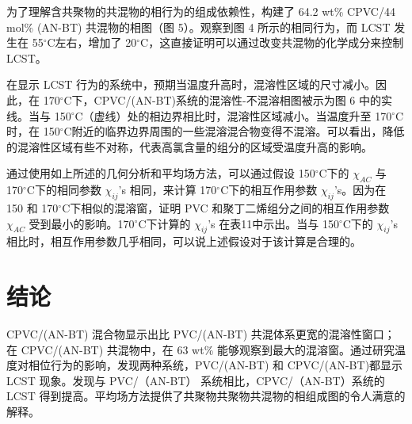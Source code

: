 \documentclass[a4paper,transmag,12pt]{IEEEtran}    %
\newcommand{\cdegree}{$^{\circ}$C}  %
\begin{document}
为了理解含共聚物的共混物的相行为的组成依赖性，构建了 64.2 wt\% CPVC/44 mol\% (AN-BT) 共混物的相图（图 5）。观察到图 4 所示的相同行为，而 LCST 发生在 55\cdegree 左右，增加了 20\cdegree，这直接证明可以通过改变共混物的化学成分来控制 LCST。\par{}
在显示 LCST 行为的系统中，预期当温度升高时，混溶性区域的尺寸减小。因此，在 170\cdegree 下，CPVC/(AN-BT)系统的混溶性-不混溶相图被示为图 6 中的实线。当与 150\cdegree（虚线）处的相边界相比时，混溶性区域减小。当温度升至 170\cdegree 时，在 150\cdegree 附近的临界边界周围的一些混溶混合物变得不混溶。可以看出，降低的混溶性区域有些不对称，代表高氯含量的组分的区域受温度升高的影响。\par{}
通过使用如上所述的几何分析和平均场方法，可以通过假设 150\cdegree 下的 $\chi_{AC}$ 与 170\cdegree 下的相同参数 $\chi_{ij}$'s 相同，来计算 170\cdegree 下的相互作用参数 $\chi_{ij}$'s。因为在 150 和 170\cdegree 下相似的混溶窗，证明 PVC 和聚丁二烯组分之间的相互作用参数 $\chi_{AC}$ 受到最小的影响。170\cdegree 下计算的 $\chi_{ij}$'s 在表11中示出。当与 150\cdegree 下的 $\chi_{ij}$'s 相比时，相互作用参数几乎相同，可以说上述假设对于该计算是合理的。\par{}

\section{结论}
CPVC/(AN-BT) 混合物显示出比 PVC/(AN-BT) 共混体系更宽的混溶性窗口；在 CPVC/(AN-BT) 共混物中，在 63 wt\% 能够观察到最大的混溶窗。通过研究温度对相位行为的影响，发现两种系统，PVC/(AN-BT) 和 CPVC/(AN-BT)都显示 LCST 现象。发现与 PVC/（AN-BT） 系统相比，CPVC/（AN-BT）系统的 LCST 得到提高。平均场方法提供了共聚物共聚物共混物的相组成图的令人满意的解释。
\end{document}
